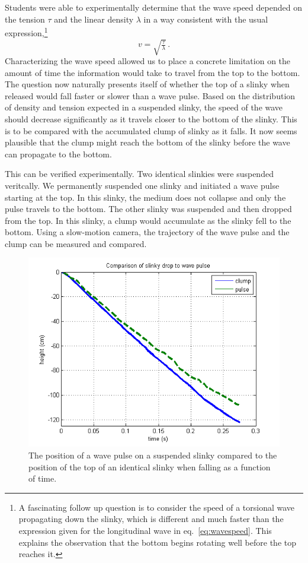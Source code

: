 \documentclass[prb,preprint,superscriptaddress]{revtex4-1}
\newcommand{\eq}[1]{eq.~\eqref{eq:#1}}
\begin{document}
Students were able to experimentally determine that the wave speed depended on the 
tension $\tau$ and the linear density $\lambda$ in a way consistent with the
usual expression,\footnote{A fascinating follow up question is to consider the speed
of a torsional wave propagating down the slinky, which is different and much faster
than the expression given for the longitudinal wave in \eq{wavespeed}.
This explains the observation that the bottom begins
rotating well before the top reaches it.}
\begin{equation}
  \label{eq:wavespeed}
  v=\sqrt{\tfrac{\tau}{\lambda}}\,.
\end{equation}
Characterizing the wave speed allowed us to place a concrete limitation on the amount
of time the information would take to travel from the top to the bottom. The question
now naturally presents itself of whether the top of a slinky when released would fall
faster or slower than a wave pulse. Based on the distribution 
of density and tension expected in a suspended slinky, the speed of the wave should decrease significantly as
it travels closer to the bottom of the slinky. This is to be compared with the
accumulated clump of slinky as it falls. It now seems plausible
that the clump might reach the bottom of the slinky before the wave can propagate to the bottom.

This can be verified experimentally. Two identical slinkies were suspended veritcally.
We permanently suspended one slinky and initiated a wave pulse starting at the top.
In this slinky, the medium does not collapse and only the pulse travels to the bottom. The other slinky was suspended and then dropped from the top. In this
slinky, a clump would accumulate as the slinky fell to the bottom. Using a slow-motion camera, the trajectory of the wave pulse
and the clump can be measured and compared.

\begin{figure}[t!]
\begin{center}
\includegraphics[scale=0.5]{figs/ClumpPulse}
\end{center}
\vspace{-4ex}
\caption{The position of a wave pulse on a suspended slinky compared to the position
of the top of an identical slinky when falling as a function of time.}
\label{fig:clumppulse}
\end{figure}
\end{document}
